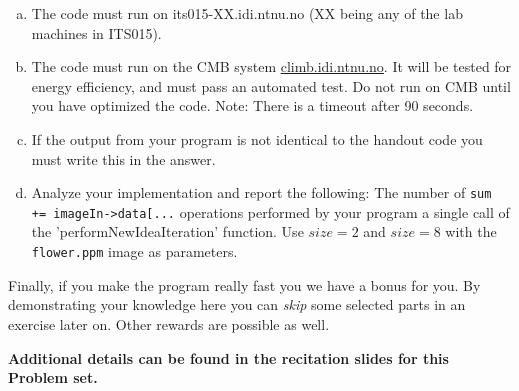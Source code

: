 \documentclass[10pt,a4paper]{article}
\begin{document}
\begin{enumerate}[a)]
\begin{itemize}
\end{itemize}
	\item The code must run on its015-XX.idi.ntnu.no (XX being any of the lab machines in ITS015).
	\item The code must run on the CMB system \url{climb.idi.ntnu.no}. It will be tested for energy efficiency, and must pass an automated test. Do not run on CMB until you have optimized the code. Note: There is a timeout after 90 seconds.
	\item If the output from your program is not identical to the handout code you must write this in the answer.
	\item Analyze your implementation and report the following: The number of \texttt{sum += imageIn->data[...} operations performed by your program a single call of the 'performNewIdeaIteration' function. Use $size=2$ and $size=8$ with the \texttt{flower.ppm} image as parameters.
\end{enumerate}

Finally, if you make the program really fast you we have a bonus for you. By demonstrating your knowledge here you can \emph{skip} some selected parts in an exercise later on. Other rewards are possible as well.
	

\vspace{\baselineskip}
\textbf{Additional details can be found in the recitation slides for this Problem set.}
\end{document}
